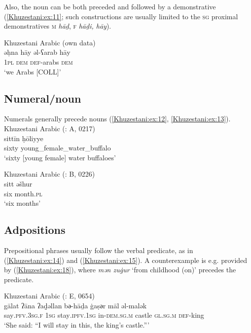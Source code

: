 \documentclass[output=paper,colorlinks,citecolor=brown,draftmode]{langscibook}
\begin{document}
Also, the noun can be both preceded and followed by a demonstrative (\ref{Khuzestani:ex:11}; such constructions are usually limited to the \textsc{sg} proximal demonstratives \textsc{m} \textit{hāḏ}, \textsc{f} \textit{hāḏi, hāy}). 

\ea\label{Khuzestani:ex:11}
Khuzestani Arabic (own data) \\
\gll əḥna hāy əl-ʕarab hāy \\
\textsc{1pl} \textsc{dem} \textsc{def-}arabs \textsc{dem} \\
\glt `we Arabs [COLL]' 
\z

\subsection{Numeral/noun }\label{Khuzestani:ss:2.4}

Numerals generally precede nouns (\ref{Khuzestani:ex:12}, \ref{Khuzestani:ex:13}).
\ea\label{Khuzestani:ex:12}
Khuzestani Arabic (\citealt{leitnerArabic2021}: A, 0217) \\
\gll sittīn ḥōliyye \\
sixty young\_female\_water\_buffalo \\
\glt `sixty [young female] water buffaloes' 
\z

\ea\label{Khuzestani:ex:13}
Khuzestani Arabic (\citealt{leitnerArabic2021}: B, 0226) \\
\gll sitt əšhur \\
six month\textsc{.pl} \\
\glt `six months' 
\z

\subsection{Adpositions }\label{Khuzestani:ss:2.5}

Prepositional phrases usually follow the verbal predicate, as in (\ref{Khuzestani:ex:14}) and (\ref{Khuzestani:ex:15}). A counterexample is e.g. provided by (\ref{Khuzestani:ex:18}), where \textit{mən zuġur} `from childhood (on)' precedes the predicate. 

\ea\label{Khuzestani:ex:14}
Khuzestani Arabic (\citealt{leitnerArabic2021}: E, 0654) \\
\gll gālat ʔāna ʔaḏ̣əllan bә-hāḏa ġaṣәr māl əl-malək \\
say\textsc{.pfv.3sg.f} \textsc{1sg} stay\textsc{.ipfv.1sg} in\textsc{-dem.sg.m} castle \textsc{gl.sg.m} \textsc{def-}king \\
\glt `She said: ``I will stay in this, the king's castle.''' 
\z
\end{document}
